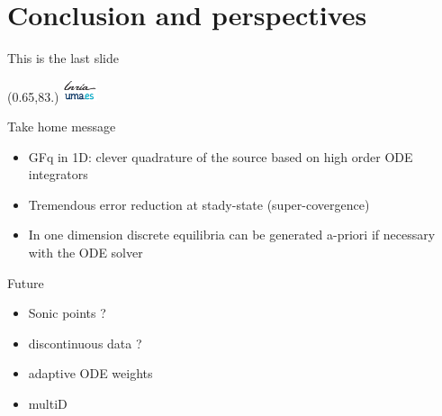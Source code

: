 \documentclass[aspectratio=169,9pt,mathserif]{beamer}
\newcommand{\MyLogoa}{%
 \begin{textblock}{14}(0.65,83.)%
  \includegraphics[width=1cm,angle=00]{logos-Inria-UMA} 
 \end{textblock}

}
\begin{document}

 
      


\section[End]{Conclusion and perspectives}

  

 \begin{frame}{This is the last slide} 
\MyLogoa


\begin{block}{Take home message}
\begin{itemize}
\item GFq in 1D:  clever   quadrature of
the source based on high order ODE integrators

\vspace{0.1cm}

\item Tremendous error reduction  at stady-state (super-covergence)

\vspace{0.1cm}


\item  In one dimension  discrete equilibria can be generated a-priori if necessary   with the ODE solver

 
 \end{itemize}
 \end{block} 

\begin{alertblock}{Future}
\begin{itemize}
\item   Sonic points ? 

\vspace{0.1cm}

\item discontinuous  data ?

\vspace{0.1cm}

\item adaptive ODE weights

\vspace{0.1cm}

\item multiD 
 \end{itemize}
 \end{alertblock} 
 \end{frame}



 

%
%
% 
% 
  

  
 
\end{document}
